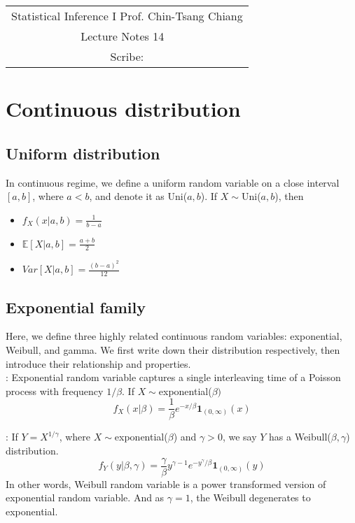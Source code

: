 \documentclass[../Distributions.tex]{subfiles}
\begin{document}
	\begin{center}
		\renewcommand{\arraystretch}{2}
		\begin{bfseries}
			\begin{tabular}{|c|}
				\hline
				Statistical Inference I \hfill Prof. Chin-Tsang Chiang\\
				\hspace{15em} {\large Lecture Notes 14} \hspace{15em}\ \\
				\lecdate \hfill Scribe: \scribe\\
				\hline
			\end{tabular}
			\renewcommand{\arraystretch}{1}
		\end{bfseries}
	\end{center}

\section{Continuous distribution}
\subsection{Uniform distribution}
In continuous regime, we define a uniform random variable on a close interval $[a,b]$, where $a<b$, and denote it as Uni($a,b$). If $X\sim$Uni($a,b$), then
\begin{itemize}
	\item $f_X(x|a,b) = \frac{1}{b-a}$
	\item $\mathbb{E}[X|a,b] = \frac{a+b}{2}$
	\item $Var[X|a,b] = \frac{(b-a)^2}{12}$
\end{itemize}

\subsection{Exponential family}
Here, we define three highly related continuous random variables: exponential, Weibull, and gamma. We first write down their distribution respectively, then introduce their relationship and properties.\\

: Exponential random variable captures a single interleaving time of a Poisson process with frequency $1/\beta$. If $X\sim$exponential($\beta)$
$$f_X(x|\beta) = \frac{1}{\beta}e^{-x/\beta}\mathbf{1}_{(0,\infty)}(x)$$

: If $Y=X^{1/\gamma}$, where $X\sim$exponential($\beta$) and $\gamma>0$, we say $Y$ has a Weibull($\beta,\gamma$) distribution.
$$f_Y(y|\beta,\gamma) = \frac{\gamma}{\beta}y^{\gamma-1}e^{-y^{\gamma}/\beta}\mathbf{1}_{(0,\infty)}(y)$$
In other words, Weibull random variable is a power transformed version of exponential random variable. And as $\gamma=1$, the Weibull degenerates to exponential.
\end{document}
